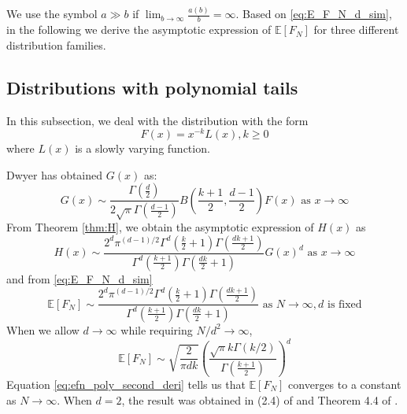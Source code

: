 \documentclass{aptpub}
\def\E{\mathbb{E}}
\begin{document}
We use the symbol $a \gg b$ if $\lim_{b\to \infty} \frac{a(b)}{b} = \infty$.
Based on \eqref{eq:E_F_N_d_sim}, in the following
we derive the asymptotic expression of $\E[F_N]$
for three different distribution families.
\subsection{Distributions with polynomial tails}
In this subsection, we deal with the distribution with the form
\begin{equation}\label{eq:F_poly_tail}
     F(x) = x^{-k} L(x), k\geq 0
\end{equation}
where $L(x)$ is a slowly varying function.

Dwyer\cite{dwyer1991convex} has obtained $G(x)$ as:
\begin{equation}
     G(x) \sim \frac{\Gamma(\frac{d}{2})}{2\sqrt{\pi} \Gamma(\frac{d-1}{2})}
     B\left(\frac{k+1}{2}, \frac{d-1}{2}\right) F(x)  \textrm{ as } x\to \infty
\end{equation}
From Theorem \ref{thm:H}, we obtain the asymptotic
expression of $H(x)$ as
\begin{equation}
     H(x) \sim \frac{2^d \pi^{(d-1)/2}\Gamma^d(\frac{k}{2}+1)
     \Gamma(\frac{dk+1}{2})}{
         \Gamma^d(\frac{k+1}{2}) \Gamma(\frac{dk}{2}+1)} G(x)^d 
         \textrm{ as } x\to \infty
\end{equation}
and from \eqref{eq:E_F_N_d_sim}
\begin{equation}\label{eq:efn_poly_second_deri}
    \E[F_N] \sim \frac{2^d \pi^{(d-1)/2}\Gamma^d(\frac{k}{2}+1)
    \Gamma(\frac{dk+1}{2})}{
        \Gamma^d(\frac{k+1}{2}) \Gamma(\frac{dk}{2}+1)}
        \textrm{ as } N \to \infty, d \textrm { is fixed}
\end{equation}
When we allow $d\to \infty$ while requiring $N/d^2 \to \infty$,
\begin{equation}\label{eq:poly_E_F_N_d_infty}
\E[F_N] \sim \sqrt{\frac{2}{\pi dk}}\left(
     \frac{\sqrt{\pi}k \Gamma(k/2)}
     {\Gamma(\frac{k+1}{2})}
 \right)^d
\end{equation}
Equation \eqref{eq:efn_poly_second_deri} tells
us that $\E[F_N]$ converges to a constant as $N \to \infty$.
When $d=2$, the result was obtained in (2.4) of \cite{carnal1970konvexe}
and Theorem 4.4 of \cite{davis1987convex}.
\end{document}
